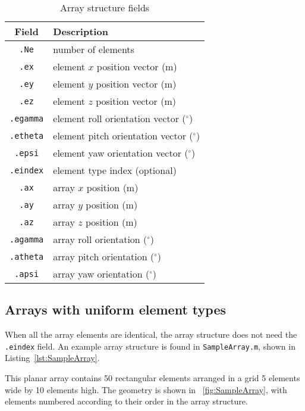 \begin{table}[!ht]
	\begin{center}
		\caption{Array structure fields}
		\label{tab:ArrayFields}
		\begin{tabular}{c|l} 
			\textbf{Field} & \textbf{Description} \\
			\hline
			\texttt{.Ne} & number of elements \\
			\texttt{.ex} & element $x$ position vector (m) \\
			\texttt{.ey} & element $y$ position vector (m) \\
			\texttt{.ez} & element $z$ position vector (m) \\
			\texttt{.egamma} & element roll orientation vector ($^\circ$) \\
			\texttt{.etheta} & element pitch orientation vector ($^\circ$) \\
			\texttt{.epsi} & element yaw orientation vector ($^\circ$) \\
			\texttt{.eindex} & element type index (optional) \\
			\texttt{.ax} & array $x$ position (m) \\
			\texttt{.ay} & array $y$ position (m) \\
			\texttt{.az} & array $z$ position (m) \\
			\texttt{.agamma} & array roll orientation ($^\circ$) \\
			\texttt{.atheta} & array pitch orientation ($^\circ$) \\
			\texttt{.apsi} & array yaw orientation ($^\circ$) \\
		\end{tabular}
	\end{center}
\end{table}

\subsection{Arrays with uniform element types}

When all the array elements are identical, the array structure does not need the \texttt{.eindex} field. An example array structure is found in \texttt{SampleArray.m}, shown in Listing~\ref{lst:SampleArray}.



This planar array contains 50 rectangular elements arranged in a grid 5 elements wide by 10 elements high. The geometry is shown in \figname~\ref{fig:SampleArray}, with elements numbered according to their order in the array structure.

